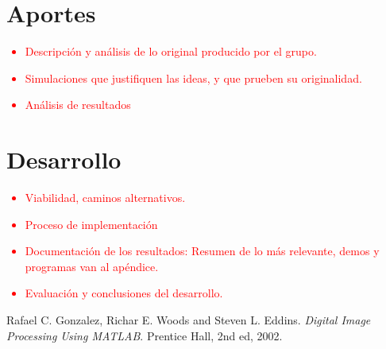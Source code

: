 \section{Aportes}
\textcolor{red}{
\begin{itemize}
	\item Descripción y análisis de lo original producido por el grupo.
	\item Simulaciones que justifiquen las ideas, y que prueben su originalidad.
	\item Análisis de resultados
\end{itemize}
}

\section{Desarrollo}
\textcolor{red}{
\begin{itemize}
	\item Viabilidad, caminos alternativos.
	\item Proceso de implementación
	\item Documentación de los resultados: Resumen de lo más relevante, demos y programas van al apéndice.
	\item Evaluación y conclusiones del desarrollo.
\end{itemize}
}

\begin{thebibliography}{9}
Rafael C. Gonzalez, Richar E. Woods and Steven L. Eddins. \textit{Digital Image Processing Using MATLAB}. Prentice Hall, 2nd ed, 2002.
\end{thebibliography}

